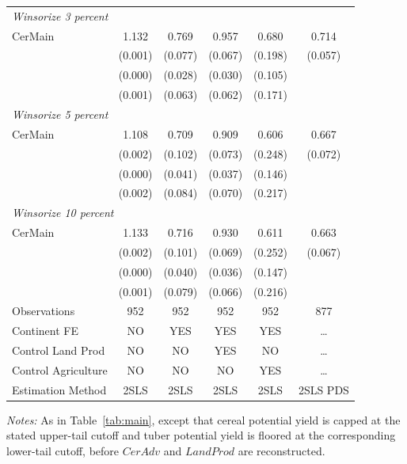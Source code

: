 \documentclass[11pt]{article}
\begin{document}
\begin{table}[htbp]
\begin{tabular}{l*{5}{c}}
\hline
\multicolumn{6}{l}{\textit{Winsorize 3 percent}}\\
CerMain         &    1.132         &    0.769         &    0.957         &    0.680         &    0.714         \\
&  (0.001)\sym{***}&  (0.077)\sym{*}  &  (0.067)\sym{*}  &  (0.198)         &  (0.057)\sym{*}  \\
& (0.000)\sym{***} & (0.028)\sym{**} & (0.030)\sym{**} & (0.105) \\
& (0.001)\sym{***} & (0.063)\sym{*} & (0.062)\sym{*} & (0.171) \\

\hline
\multicolumn{6}{l}{\textit{Winsorize 5 percent}}\\
CerMain  &    1.108  &    0.709  &    0.909  &    0.606  &    0.667  \\
         &  (0.002)\sym{***}&  (0.102)  &  (0.073)\sym{*}  &  (0.248)  &  (0.072)\sym{*}  \\
         &  (0.000)\sym{***} & (0.041)\sym{**} & (0.037)\sym{**} & (0.146) & \\
         &  (0.002)\sym{***} & (0.084)\sym{*} & (0.070)\sym{*} & (0.217) & \\
\hline
\multicolumn{6}{l}{\textit{Winsorize 10 percent}}\\
CerMain  &    1.133  &    0.716  &    0.930  &    0.611  &    0.663  \\
         &  (0.002)\sym{***}&  (0.101)  &  (0.069)\sym{*}  &  (0.252)  &  (0.067)\sym{*}  \\
         &  (0.000)\sym{***} & (0.040)\sym{**} & (0.036)\sym{**} & (0.147) & \\
         &  (0.001)\sym{***} & (0.079)\sym{*} & (0.066)\sym{*} & (0.216) & \\
\hline
Observations       &  952 &  952 &  952 &  952 &  877 \\
Continent FE       &   NO & YES & YES & YES & \ldots \\
Control Land Prod  &   NO &  NO & YES &  NO & \ldots \\
Control Agriculture&   NO &  NO &  NO & YES & \ldots \\
Estimation Method  & 2SLS & 2SLS & 2SLS & 2SLS & 2SLS PDS \\
\hline\hline
\end{tabular}

\vspace{2pt}
\begin{minipage}{0.98\textwidth}
\scriptsize \textit{Notes:} As in Table~\ref{tab:main}, except that cereal potential yield
is capped at the stated upper-tail cutoff and tuber potential yield is floored at the
corresponding lower-tail cutoff, before $CerAdv$ and $LandProd$ are reconstructed.
\end{minipage}
\end{table}
\end{document}
